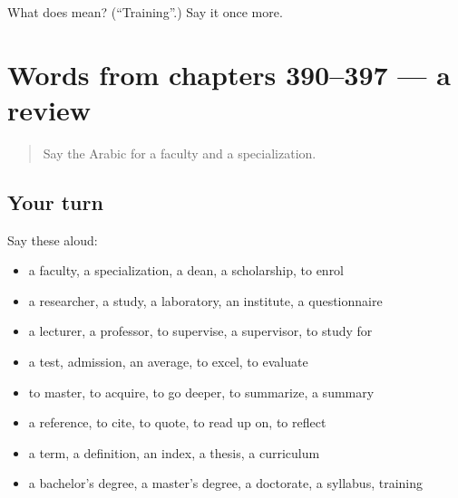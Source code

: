 \begin{tcolorbox}[breakable,colback=teal!4,colframe=teal!35!black,title={Before you move on}]
What does  mean? (\textquotedblleft{}Training\textquotedblright{}.) Say it once more.
\end{tcolorbox}
\section[(dialogue)]{Words from chapters 390–397 — a review}

\label{lesson:AR-R397-review-390-397}



\begin{quote}
Say the Arabic for a faculty and a specialization.
\end{quote}

\subsection*{Your turn}
Say these aloud:

\begin{itemize}
\raggedright
  \item a faculty, a specialization, a dean, a scholarship, to enrol
  \item a researcher, a study, a laboratory, an institute, a questionnaire
  \item a lecturer, a professor, to supervise, a supervisor, to study for
  \item a test, admission, an average, to excel, to evaluate
  \item to master, to acquire, to go deeper, to summarize, a summary
  \item a reference, to cite, to quote, to read up on, to reflect
  \item a term, a definition, an index, a thesis, a curriculum
  \item a bachelor's degree, a master's degree, a doctorate, a syllabus, training
\end{itemize}

